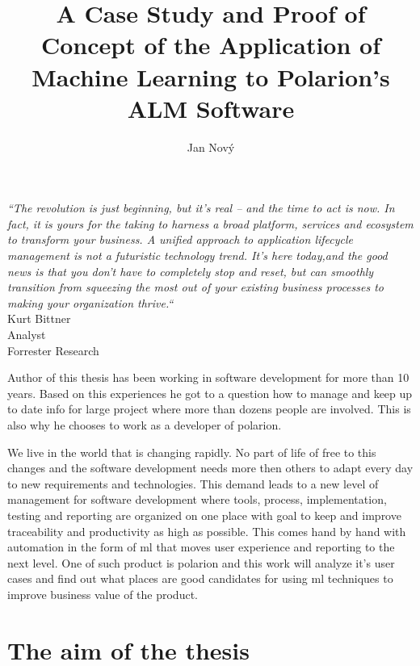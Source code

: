\documentclass[thesis=M,english]{FITthesis}[2012/06/26]
\title{A Case Study and Proof of Concept of the Application of Machine Learning to Polarion's ALM Software}
\author{Jan Nový} %
\begin{document}

\todototoc
\listoftodos

\begin{introduction}
\begin{center}
	\textit{“The revolution is just beginning, but it’s real – and the time to act is now. In fact, it is yours for the taking to harness a broad platform, services and ecosystem to transform your business. A unified approach to application lifecycle management is not a futuristic technology trend. It’s here today,and the good news is that you don’t have to completely stop and reset, but can smoothly transition from squeezing the most out of your existing business processes to making your organization thrive.“}\\
Kurt Bittner\\
Analyst\\
Forrester Research\\
\end{center}
\end{introduction}

Author of this thesis has been working in software development for more than 10 years. Based on this experiences he got to a question how to manage and keep up to date info for large project where more than dozens people are involved. This is also why he chooses to work as a developer of \acrshort{polarion}.


We live in the world that is changing rapidly. No part of life of free to this changes and the software development needs more then others to adapt every day to new requirements and technologies. This demand leads to a new level of management for software development where tools, process, implementation, testing and reporting are organized on one place with goal to keep and improve traceability and productivity as high as possible. This comes hand by hand with automation in the form of \acrshort{ml} that moves user experience and reporting to the next level. One of such product is \acrshort{polarion}\cite{polarion_alm} and this work will analyze it's user cases and find out what places are good candidates for using \acrshort{ml} techniques to improve business value of the product. 

\chapter{The aim of the thesis}
\end{document}
